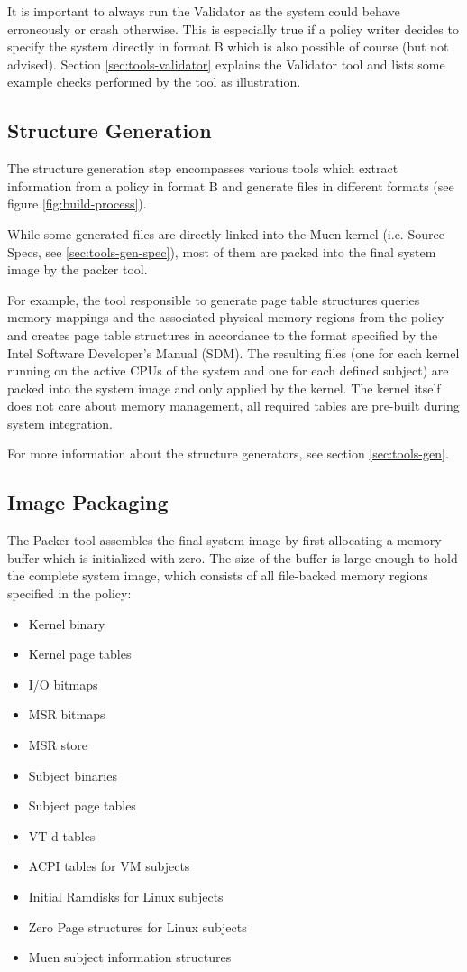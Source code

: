 \documentclass[a4paper,twoside,titlepage]{article}
\begin{document}
It is important to always run the Validator as the system could behave
erroneously or crash otherwise. This is especially true if a policy writer
decides to specify the system directly in format B which is also possible of
course (but not advised).  Section \ref{sec:tools-validator} explains the
Validator tool and lists some example checks performed by the tool as
illustration.

\subsection{Structure Generation}
The structure generation step encompasses various tools which extract
information from a policy in format B and generate files in different formats
(see figure \ref{fig:build-process}).

While some generated files are directly linked into the Muen kernel (i.e.
Source Specs, see \ref{sec:tools-gen-spec}), most of them are packed into the
final system image by the packer tool.

For example, the tool responsible to generate page table structures queries
memory mappings and the associated physical memory regions from the policy and
creates page table structures in accordance to the format specified by the Intel
Software Developer's Manual (SDM). The resulting files (one for each kernel
running on the active CPUs of the system and one for each defined subject) are
packed into the system image and only applied by the kernel. The kernel itself
does not care about memory management, all required tables are pre-built during
system integration.

For more information about the structure generators, see section
\ref{sec:tools-gen}.

\subsection{Image Packaging}
The Packer tool assembles the final system image by first allocating a memory
buffer which is initialized with zero. The size of the buffer is large enough
to hold the complete system image, which consists of all file-backed memory
regions specified in the policy:

\begin{itemize}
	\item Kernel binary
	\item Kernel page tables
	\item I/O bitmaps
	\item MSR bitmaps
	\item MSR store
	\item Subject binaries
	\item Subject page tables
	\item VT-d tables
	\item ACPI tables for VM subjects
	\item Initial Ramdisks for Linux subjects
	\item Zero Page structures for Linux subjects
	\item Muen subject information structures
\end{itemize}
\end{document}
